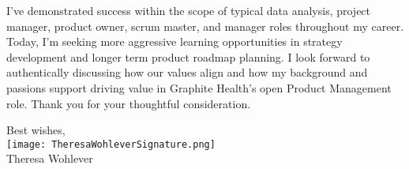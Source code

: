\documentclass[10pt,letterpaper]{article}
\begin{document}
\begin{flushleft}
	I\rq{}ve demonstrated success within the scope of typical data analysis, project manager, product owner,  scrum master, and manager roles throughout my career. Today, I\rq{}m seeking more aggressive learning opportunities in strategy development and longer term product roadmap planning. I look forward to authentically discussing how our values align and how my background and passions support driving value in Graphite Health\rq{}s open Product Management role. Thank you for your thoughtful consideration.
	

\end{flushleft}


\hspace*{.6\linewidth} Best wishes, \\
\hspace*{.57\linewidth} \texttt{[image: TheresaWohleverSignature.png]}  {\vspace{-9pt}} \\
\hspace*{.6\linewidth}  Theresa Wohlever
\end{document}
